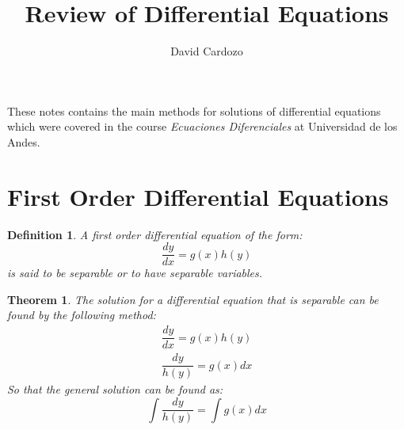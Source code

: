 \documentclass[10pt,a4paper]{article}
\author{David Cardozo}
\title{Review of Differential Equations}
\newtheorem{define}{Definition}
\newtheorem{thm}{Theorem}
\begin{document}
\maketitle
These notes contains the main methods for solutions of differential equations which were covered in  the course \textit{Ecuaciones Diferenciales} at Universidad de los Andes.
\section{First Order Differential Equations}
\begin{define}
A first order differential equation of the form:
\begin{equation}
\dfrac{dy}{dx} = g(x)h(y)
\end{equation}
is said to be separable or to have separable variables.
\end{define}
\begin{thm}
The solution for a differential equation that is separable can be found by the following method:
\begin{align*}
\dfrac{dy}{dx} = g(x)h(y) \\
\dfrac{dy}{h(y)} = g(x)dx
\end{align*}
So that the general solution can be found as:
\begin{equation}
\int \dfrac{dy}{h(y)} = \int g(x) dx
\end{equation}
\end{thm}
\end{document}
